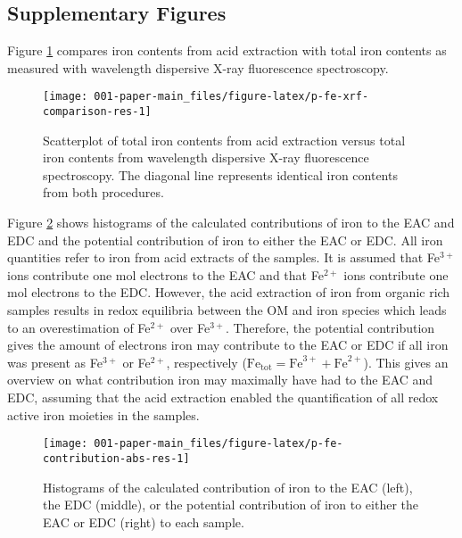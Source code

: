 \documentclass[alpha-refs]{wiley-article-rmd}
\begin{document}
\begin{refsection}
\clearpage

\hypertarget{supplementary-figures}{%
\subsection{Supplementary Figures}\label{supplementary-figures}}

Figure \ref{fig:p-fe-xrf-comparison-res} compares iron contents from acid extraction with total iron contents as measured with wavelength dispersive X-ray fluorescence spectroscopy.

\begin{figure}[H]

{\centering \texttt{[image: 001-paper-main\_files/figure-latex/p-fe-xrf-comparison-res-1]}

}

\caption{Scatterplot of total iron contents from acid extraction versus total iron contents from wavelength dispersive X-ray fluorescence spectroscopy. The diagonal line represents identical iron contents from both procedures.}\label{fig:p-fe-xrf-comparison-res}
\end{figure}

Figure \ref{fig:p-fe-contribution-abs-res} shows histograms of the calculated contributions of iron to the EAC and EDC and the potential contribution of iron to either the EAC or EDC. All iron quantities refer to iron from acid extracts of the samples. It is assumed that Fe\(^{3+}\) ions contribute one mol electrons to the EAC and that Fe\(^{2+}\) ions contribute one mol electrons to the EDC. However, the acid extraction of iron from organic rich samples results in redox equilibria between the OM and iron species which leads to an overestimation of Fe\(^{2+}\) over Fe\(^{3+}\). Therefore, the potential contribution gives the amount of electrons iron may contribute to the EAC or EDC if all iron was present as Fe\(^{3+}\) or Fe\(^{2+}\), respectively (\(\text{Fe}_\text{tot}=\text{Fe}^{3+} + \text{Fe}^{2+}\)). This gives an overview on what contribution iron may maximally have had to the EAC and EDC, assuming that the acid extraction enabled the quantification of all redox active iron moieties in the samples.

\begin{figure}[H]

{\centering \texttt{[image: 001-paper-main\_files/figure-latex/p-fe-contribution-abs-res-1]}

}

\caption{Histograms of the calculated contribution of iron to the EAC (left), the EDC (middle), or the potential contribution of iron to either the EAC or EDC (right) to each sample.}\label{fig:p-fe-contribution-abs-res}
\end{figure}


\end{refsection}
\end{document}
